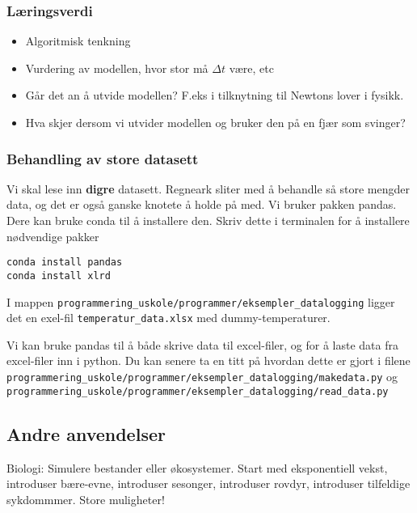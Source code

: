\documentclass[11pt]{article}
\providecommand{\tightlist}{%
      \setlength{\itemsep}{0pt}\setlength{\parskip}{0pt}}
\begin{document}
    \hypertarget{luxe6ringsverdi}{%
\subsubsection{Læringsverdi}\label{luxe6ringsverdi}}

\begin{itemize}
\tightlist
\item
  Algoritmisk tenkning
\item
  Vurdering av modellen, hvor stor må \(\Delta t\) være, etc
\item
  Går det an å utvide modellen? F.eks i tilknytning til Newtons lover i
  fysikk.
\item
  Hva skjer dersom vi utvider modellen og bruker den på en fjær som
  svinger?
\end{itemize}

    \hypertarget{behandling-av-store-datasett}{%
\subsubsection{Behandling av store
datasett}\label{behandling-av-store-datasett}}

Vi skal lese inn \textbf{digre} datasett. Regneark sliter med å behandle
så store mengder data, og det er også ganske knotete å holde på med. Vi
bruker pakken pandas. Dere kan bruke conda til å installere den. Skriv
dette i terminalen for å installere nødvendige pakker

\begin{verbatim}
conda install pandas
conda install xlrd
\end{verbatim}

    I mappen
\texttt{programmering\_uskole/programmer/eksempler\_datalogging} ligger
det en exel-fil \texttt{temperatur\_data.xlsx} med dummy-temperaturer.

    Vi kan bruke pandas til å både skrive data til excel-filer, og for å
laste data fra excel-filer inn i python. Du kan senere ta en titt på
hvordan dette er gjort i filene
\texttt{programmering\_uskole/programmer/eksempler\_datalogging/makedata.py}
og
\texttt{programmering\_uskole/programmer/eksempler\_datalogging/read\_data.py}

    \hypertarget{andre-anvendelser}{%
\subsection{Andre anvendelser}\label{andre-anvendelser}}

Biologi: Simulere bestander eller økosystemer. Start med eksponentiell
vekst, introduser bære-evne, introduser sesonger, introduser rovdyr,
introduser tilfeldige sykdommmer. Store muligheter!
\end{document}
